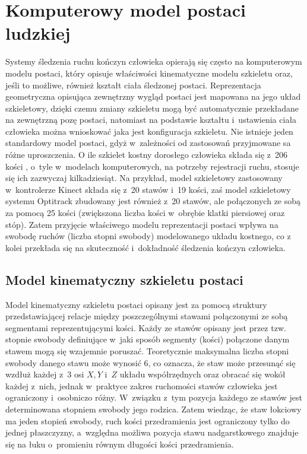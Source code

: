 \section{Komputerowy model postaci ludzkiej} \label{chap:bodyRep}
Systemy śledzenia ruchu kończyn człowieka opierają się często na komputerowym modelu postaci, który opisuje właściwości kinematyczne modelu szkieletu oraz, jeśli to możliwe, również kształt ciała śledzonej postaci. Reprezentacja geometryczna opisująca zewnętrzny wygląd postaci jest mapowana na jego układ szkieletowy, dzięki czemu zmiany szkieletu mogą być automatycznie przekładane na zewnętrzną pozę postaci, natomiast na podstawie kształtu i~ustawienia ciała człowieka można wnioskować jaka jest konfiguracja szkieletu. 
Nie istnieje jeden standardowy model postaci, gdyż w~zależności od zastosowań przyjmowane sa różne uproszczenia. O ile szkielet kostny dorosłego człowieka składa się z~206 kości \cite{Lasinski1990}, o~tyle w~modelach komputerowych, na potrzeby rejestracji ruchu, stosuje się ich zazwyczaj kilkadziesiąt. Na przykład, model szkieletowy zastosowany w~kontrolerze Kinect składa się z~20 stawów i~19 kości, zaś model szkieletowy systemu Optitrack zbudowany jest również z~20 stawów, ale połączonych ze sobą za pomocą 25 kości (zwiększona liczba kości w~obrębie klatki piersiowej oraz stóp). Zatem przyjęcie właściwego modelu reprezentacji postaci wpływa na swobodę ruchów (liczba stopni swobody) modelowanego układu kostnego, co z kolei przekłada się na skuteczność i~dokładność śledzenia kończyn człowieka.
											
\subsection{Model kinematyczny szkieletu postaci}
Model kinematyczny szkieletu postaci opisany jest za pomocą struktury przedstawiającej relacje między poszczególnymi stawami połączonymi ze sobą segmentami reprezentującymi kości. Każdy ze stawów opisany jest przez tzw. stopnie swobody definiujące w~jaki sposób segmenty (kości) połączone danym stawem mogą się wzajemnie poruszać. Teoretycznie maksymalna liczba stopni swobody danego stawu może wynosić 6, co oznacza, że staw może przesunąć się wzdłuż każdej z~3 osi $X, Y$ i~$Z$ układu współrzędnych oraz obracać się wokół każdej z~nich, jednak w~praktyce zakres ruchomości stawów człowieka jest ograniczony i~osobniczo różny. W~związku z~tym pozycja każdego ze stawów jest determinowana stopniem swobody jego rodzica. Zatem wiedząc, że staw łokciowy ma jeden stopień swobody, ruch kości przedramienia jest ograniczony tylko do jednej płaszczyzny, a~względna możliwa pozycja stawu nadgarstkowego znajduje się na łuku o~promieniu równym długości kości przedramienia.

